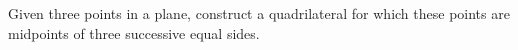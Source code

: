 Given three points in a plane, construct a quadrilateral for which these points are midpoints of three successive equal sides.
